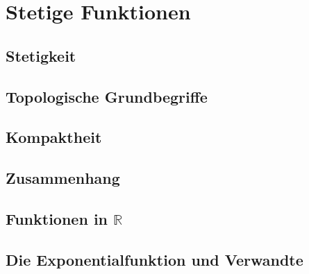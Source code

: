 \chapter{Stetige Funktionen}
\section{Stetigkeit}
\section{Topologische Grundbegriffe}
\section{Kompaktheit}
\section{Zusammenhang}
\section{Funktionen in $\mathbb R$}
\section{Die Exponentialfunktion und Verwandte}


